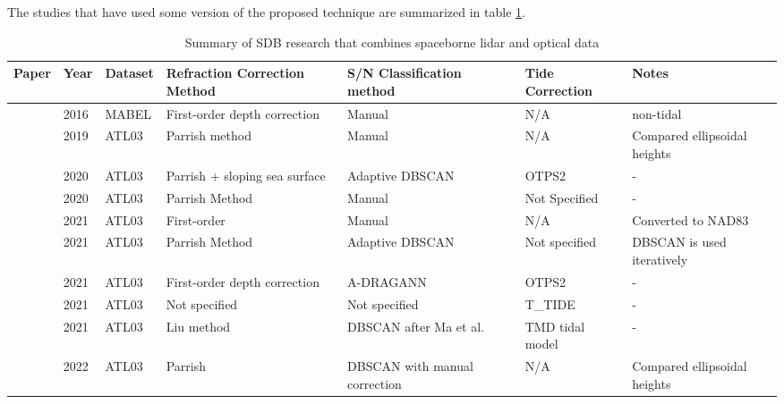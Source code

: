 The studies that have used some version of the proposed technique are summarized in table \ref{tab:researchsummary}.

\begin{landscape}
      \begin{table}
            \caption{Summary of SDB research that combines spaceborne lidar and optical data}
            \label{tab:researchsummary}
            \raggedright
            \begin{tabular}{p{3.7cm}llp{3.2cm}p{3.5cm}ll}
                  \midrule
                  Paper                              & Year & Dataset & Refraction Correction Method  & S/N Classification method     & Tide Correction & Notes                        \\
                  \hline
                  \citeauthor{Forfinski-Sarkozi2016} & 2016 & MABEL   & First-order depth correction  & Manual                        & N/A             & non-tidal                    \\
                  \citeauthor{Parrish2019}           & 2019 & ATL03   & Parrish method                & Manual                        & N/A             & Compared ellipsoidal heights \\
                  \citeauthor{Ma2020}                & 2020 & ATL03   & Parrish + sloping sea surface & Adaptive DBSCAN               & OTPS2           & -                            \\
                  \citeauthor{Thomas2021d}           & 2020 & ATL03   & Parrish Method                & Manual                        & Not Specified   & -                            \\
                  \citeauthor{Albright2021}          & 2021 & ATL03   & First-order                   & Manual                        & N/A             & Converted to NAD83           \\
                  \citeauthor{Xie2021}               & 2021 & ATL03   & Parrish Method                & Adaptive DBSCAN               & Not specified   & DBSCAN is used iteratively   \\
                  \citeauthor{Cao2021}               & 2021 & ATL03   & First-order depth correction  & A-DRAGANN                     & OTPS2           & -                            \\
                  \citeauthor{Lee2021}               & 2021 & ATL03   & Not specified                 & Not specified                 & T\_TIDE         & -                            \\
                  \citeauthor{Liu2021}               & 2021 & ATL03   & Liu method                    & DBSCAN after Ma et al.        & TMD tidal model & -                            \\
                  \citeauthor{LeQuilleuc2022b}       & 2022 & ATL03   & Parrish                       & DBSCAN with manual correction & N/A             & Compared ellipsoidal heights \\
                  \bottomrule
            \end{tabular}
      \end{table}

\end{landscape}

